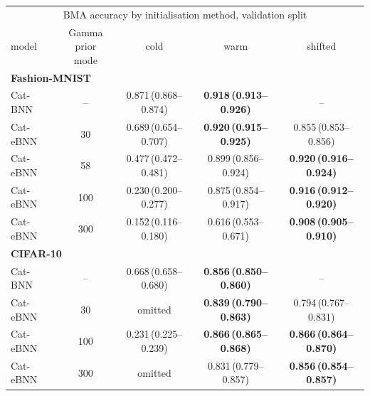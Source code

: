 \begin{tabular}{lcccc}
\toprule
\multicolumn{5}{c}{BMA accuracy by initialisation method, validation split} \\
model & \shortstack{Gamma prior\\mode} & cold & warm & shifted \\
\midrule
\multicolumn{5}{l}{\textbf{Fashion-MNIST}} \\
\midrule
Cat-BNN & -- & 0.871\,(0.868--0.874) & \textbf{0.918\,(0.913--0.926)} & -- \\
Cat-eBNN & 30 & 0.689\,(0.654--0.707) & \textbf{0.920\,(0.915--0.925)} & 0.855\,(0.853--0.856) \\
Cat-eBNN & 58 & 0.477\,(0.472--0.481) & 0.899\,(0.856--0.924) & \textbf{0.920\,(0.916--0.924)} \\
Cat-eBNN & 100 & 0.230\,(0.200--0.277) & 0.875\,(0.854--0.917) & \textbf{0.916\,(0.912--0.920)} \\
Cat-eBNN & 300 & 0.152\,(0.116--0.180) & 0.616\,(0.553--0.671) & \textbf{0.908\,(0.905--0.910)} \\
\midrule
\multicolumn{5}{l}{\textbf{CIFAR-10}} \\
\midrule
Cat-BNN & -- & 0.668\,(0.658--0.680) & \textbf{0.856\,(0.850--0.860)} & -- \\
Cat-eBNN & 30 & omitted & \textbf{0.839\,(0.790--0.863)} & 0.794\,(0.767--0.831) \\
Cat-eBNN & 100 & 0.231\,(0.225--0.239) & \textbf{0.866\,(0.865--0.868)} & \textbf{0.866\,(0.864--0.870)} \\
Cat-eBNN & 300 & omitted & 0.831\,(0.779--0.857) & \textbf{0.856\,(0.854--0.857)} \\
\bottomrule
\end{tabular}

